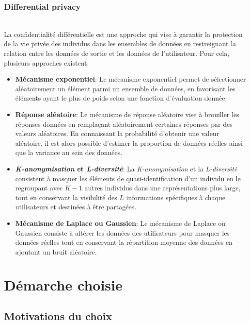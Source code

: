 \documentclass{article}
\begin{document}
    \subsubsection{Differential privacy}
    $ $\\
    La confidentialité différentielle est une approche qui vise à garantir la protection de la vie privée des individus dans les ensembles de données en restreignant la relation entre les données de sortie et les données de l'utilisateur.
    Pour cela, plusieurs approches existent:\\
    \begin{itemize}
        \item \textbf{Mécanisme exponentiel}: Le mécanisme exponentiel permet de sélectionner aléatoirement un élément parmi un ensemble de données, en favorisant les éléments ayant le plus de poids selon une fonction d'évaluation donnée.
        \item \textbf{Réponse aléatoire}: Le mécanisme de réponse aléatoire vise à brouiller les réponses données en remplaçant aléatoirement certaines réponses par des valeurs aléatoires.
        En connaissant la probabilité d'obtenir une valeur aléatoire, il est alors possible d'estimer la proportion de données réelles ainsi que la variance au sein des données.
        \item \textbf{\emph{K-anonymisation} et \emph{L-diversité}}: La \emph{K-anonymisation} et la \emph{L-diversité} consistent à masquer les éléments de quasi-identification d'un
        individu en le regroupant avec $K-1$ autres individus dans une représentations plus large, tout en conservant la visibilité des $L$ informations spécifiques à chaque utilisateurs et destinées à être partagées.
        \item \textbf{Mécanisme de Laplace ou Gaussien}: Le mécanisme de Laplace ou Gaussien consiste à altérer les données des utilisateurs pour masquer les données réelles tout en conservant la répartition moyenne des données en ajoutant un bruit aléatoire.
    \end{itemize}
    \section{Démarche choisie}
    \subsection{Motivations du choix}
\end{document}
